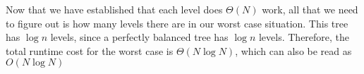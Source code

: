 \begin{blocksection}
\begin{solution}[0.25in]
Now that we have established that each level does $\Theta(N)$ work, all that we need to figure out is how many levels
there are in our worst case situation. This tree has $\log n$ levels, since a perfectly balanced tree has $\log n$ levels. Therefore, the total runtime cost for the worst case is $\Theta(N \log N)$, which can also be read as $O(N \log N)$
\end{solution}
\end{blocksection}